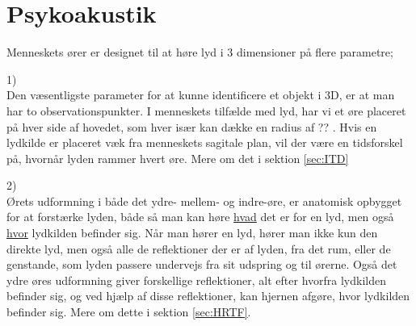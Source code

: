 \chapter{Psykoakustik}

Menneskets ører er designet til at høre lyd i 3 dimensioner på flere parametre;

{\Large  1)}\\
Den væsentligste parameter for at kunne identificere et objekt i 3D, er at man har to observationspunkter. I menneskets tilfælde med lyd, har vi et øre placeret på hver side af hovedet, som hver især kan dække en radius af ?? . Hvis en lydkilde er placeret væk fra menneskets sagitale plan, vil der være en tidsforskel på, hvornår lyden rammer hvert øre. Mere om det i sektion \ref{sec:ITD}

{\Large  2)}\\
Ørets udformning i både det ydre- mellem- og indre-øre, er anatomisk opbygget for at forstærke lyden, både så man kan høre \underline{hvad} det er for en lyd, men også \underline{hvor} lydkilden befinder sig. Når man hører en lyd, hører man ikke kun den direkte lyd, men også alle de reflektioner der er af lyden, fra det rum, eller de genstande, som lyden passere undervejs fra sit udspring og til ørerne. Også det ydre øres udformning giver forskellige reflektioner, alt efter hvorfra lydkilden befinder sig, og ved hjælp af disse reflektioner, kan hjernen afgøre, hvor lydkilden befinder sig. Mere om dette i sektion \ref{sec:HRTF}.